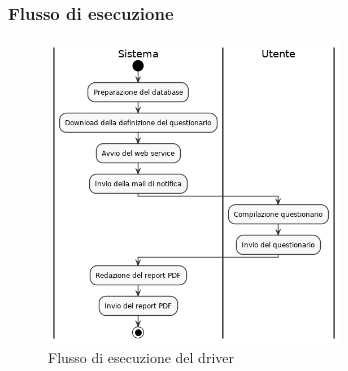 \documentclass[../main.tex]{subfiles}
\begin{document}
\subsubsection{Flusso di esecuzione}
\begin{figure}[H]
\centering
\includegraphics[height=8cm]{immagini/DRIVER_SURVEY.png}
\caption{Flusso di esecuzione del driver}\label{fig:flussodriver2}

\end{figure}
\end{document}
